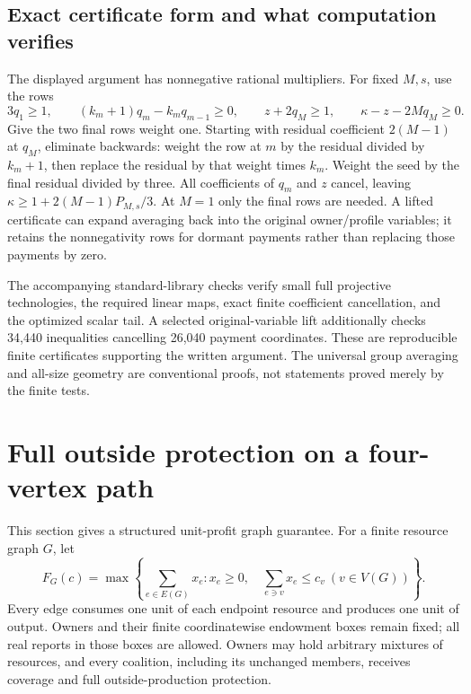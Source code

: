 \documentclass[11pt]{article}
\theoremstyle{definition}\newtheorem{definition}[theorem]{Definition}
\theoremstyle{remark}\newtheorem{remark}[theorem]{Remark}
\begin{document}
\subsection{Exact certificate form and what computation verifies}
The displayed argument has nonnegative rational multipliers. For fixed $M,s$,
use the rows
\[
 3q_1\ge1,\qquad (k_m+1)q_m-k_mq_{m-1}\ge0,
 \qquad z+2q_M\ge1,\qquad \kappa-z-2M q_M\ge0.
\]
Give the two final rows weight one. Starting with residual coefficient
$2(M-1)$ at $q_M$, eliminate backwards: weight the row at $m$ by the
residual divided by $k_m+1$, then replace the residual by that weight times
$k_m$. Weight the seed by the final residual divided by three.
All coefficients of $q_m$ and $z$ cancel, leaving
$\kappa\ge1+2(M-1)P_{M,s}/3$. At $M=1$ only the final rows are needed.
A lifted certificate can expand averaging back into the original
owner/profile variables; it retains the nonnegativity rows for dormant
payments rather than replacing those payments by zero.

The accompanying standard-library checks verify small full projective
technologies, the required linear maps, exact finite coefficient cancellation,
and the optimized scalar tail. A selected original-variable lift additionally
checks 34,440 inequalities cancelling 26,040 payment coordinates. These are
reproducible finite certificates supporting the written argument. The universal
group averaging and all-size geometry are conventional proofs, not statements
proved merely by the finite tests.


\section{Full outside protection on a four-vertex path}
\label{graph:section}

This section gives a structured unit-profit graph guarantee. For a finite
resource graph $G$, let
\begin{equation}\label{graph:production}
 F_G(c)=\max\left\{\sum_{e\in E(G)}x_e:
 x_e\ge0,\quad\sum_{e\ni v}x_e\le c_v\ (v\in V(G))\right\}.
\end{equation}
Every edge consumes one unit of each endpoint resource and produces one
unit of output. Owners and their finite coordinatewise endowment boxes
remain fixed; all real reports in those boxes are allowed. Owners may
hold arbitrary mixtures of resources, and every coalition, including its
unchanged members, receives coverage and full outside-production protection.
\end{document}
